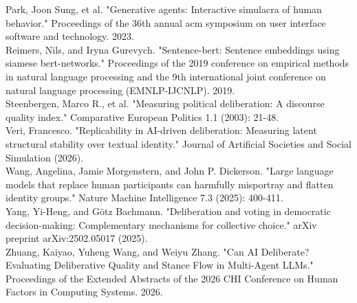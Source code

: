 \documentclass[titlepage]{article}
\begin{document}
Park, Joon Sung, et al. "Generative agents: Interactive simulacra of human behavior." Proceedings of the 36th annual acm symposium on user interface software and technology. 2023.\\

Reimers, Nils, and Iryna Gurevych. "Sentence-bert: Sentence embeddings using siamese bert-networks." Proceedings of the 2019 conference on empirical methods in natural language processing and the 9th international joint conference on natural language processing (EMNLP-IJCNLP). 2019.\\

Steenbergen, Marco R., et al. "Measuring political deliberation: A discourse quality index." Comparative European Politics 1.1 (2003): 21-48.\\

Veri, Francesco. "Replicability in AI-driven deliberation: Measuring latent structural stability over textual identity." Journal of Artificial Societies and Social Simulation (2026).\\

Wang, Angelina, Jamie Morgenstern, and John P. Dickerson. "Large language models that replace human participants can harmfully misportray and flatten identity groups." Nature Machine Intelligence 7.3 (2025): 400-411.\\

Yang, Yi-Heng, and Götz Bachmann. "Deliberation and voting in democratic decision-making: Complementary mechanisms for collective choice." arXiv preprint arXiv:2502.05017 (2025).\\

Zhuang, Kaiyao, Yuheng Wang, and Weiyu Zhang. "Can AI Deliberate? Evaluating Deliberative Quality and Stance Flow in Multi-Agent LLMs." Proceedings of the Extended Abstracts of the 2026 CHI Conference on Human Factors in Computing Systems. 2026.
\end{document}
